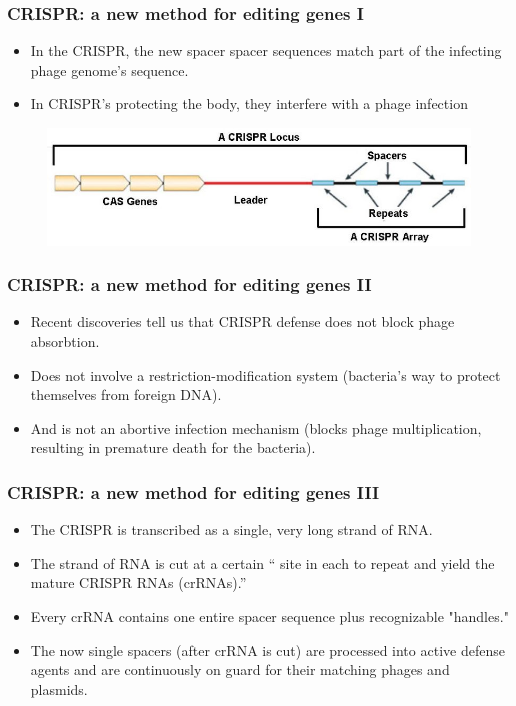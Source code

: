 \documentclass{beamer}
\begin{document}
\begin{frame}
\frametitle{CRISPR: a new method for editing genes I}
\begin{itemize}
\item
In the CRISPR, the new spacer spacer sequences match part of the infecting phage genome’s sequence.
\item In CRISPR's protecting the body, they interfere with a phage infection
\end{itemize}
\begin{figure}[h!]
  \centering
    \includegraphics[width=1\textwidth]{crispr.jpg}
\end{figure}
\end{frame}


\begin{frame}
\frametitle{CRISPR: a new method for editing genes II}
\begin{itemize}
\item  Recent discoveries tell us that CRISPR defense does not block phage absorbtion.
\item Does not involve a restriction-modification system (bacteria’s way to protect themselves from foreign DNA).
\item And is not an abortive infection mechanism (blocks phage multiplication, resulting in premature death for the bacteria).
\end{itemize}
\end{frame}

\begin{frame}
\frametitle{CRISPR: a new method for editing genes III}
\begin{itemize}
\item The CRISPR is transcribed as a single, very long strand of RNA.
\item The strand of RNA is cut at a certain ``
site in each to repeat and yield the mature CRISPR RNAs (crRNAs).”
\item Every crRNA contains one entire spacer sequence plus recognizable "handles." 
\item  The now single spacers (after crRNA is cut) are processed into active defense agents and are continuously on guard for their matching phages and 
plasmids.

\end{itemize}
\end{frame}
\end{document}
